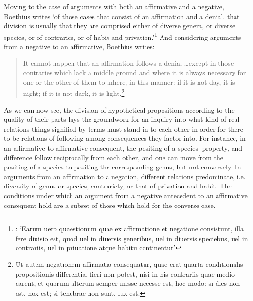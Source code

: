 \documentclass[a4paper, 11pt]{article}
\begin{document}
Moving to the case of arguments with both an affirmative and a negative, Boethius writes `of those cases that consist of an affirmation and a denial, that division is usually that they are comprised either of diverse genera, or diverse species, or of contraries, or of habit and privation.'\footnote{\autocite[1179D]{BDT}: `Earum uero quaestionum quae ex affirmatione et negatione consistunt, illa fere diuisio est, quod uel in diuersis generibus, uel in diuersis speciebus, uel in contrariis, uel in priuatione atque habitu continentur'} And considering arguments from a negative to an affirmative, Boethius writes: 
\begin{quote}
It cannot happen that an affirmation follows a denial \ldots except in those contraries which lack a middle ground and where it is always necessary for one or the other of them to inhere, in this manner: if it is not day, it is night; if it is not dark, it is light.\footnote{\autocite[1180A]{BDT} Ut autem negationem affirmatio consequatur, quae erat quarta conditionalis propositionis differentia, fieri non potest, nisi in his contrariis quae medio carent, et quorum alterum semper inesse necesse est, hoc modo: si dies non est, nox est; si tenebrae non sunt, lux est.} 
\end{quote}

As we can now see, the division of hypothetical propositions according to the quality of their parts lays the groundwork for an inquiry into what kind of real relations things signified by terms must stand in to each other in order for there to be relations of following among consequences they factor into. For instance, in an affirmative-to-affirmative consequent, the positing of a species, property, and difference follow reciprocally from each other, and one can move from the positing of a species to positing the corresponding genus, but not conversely. In arguments from an affirmation to a negation, different relations predominate, i.e.  diversity of genus or species, contrariety, or that of privation and habit. The conditions under which an argument from a negative antecedent to an affirmative consequent hold are a subset of those which hold for the converse case.
\end{document}
